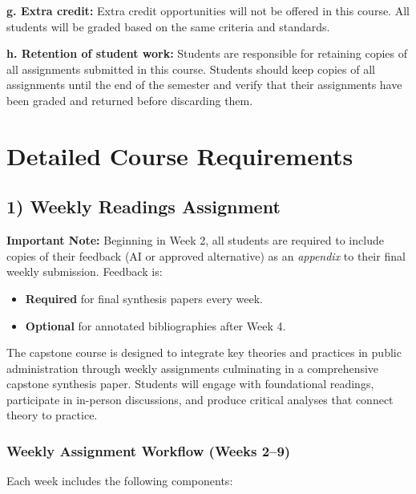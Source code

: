 \documentclass[11pt]{article}     %
\begin{document}
\vspace{1em}
\noindent \textbf{g. Extra credit:}
Extra credit opportunities will not be offered in this course. All students will be graded based on the same criteria and standards.

\vspace{1em}
\noindent \textbf{h. Retention of student work:}
Students are responsible for retaining copies of all assignments submitted in this course. Students should keep copies of all assignments until the end of the semester and verify that their assignments have been graded and returned before discarding them.

\section*{Detailed Course Requirements}

\subsection*{1) Weekly Readings Assignment}

\textbf{Important Note:} Beginning in Week 2, all students are required to include copies of their feedback (AI or approved alternative) as an \emph{appendix} to their final weekly submission. Feedback is:
\begin{itemize}
    \item \textbf{Required} for final synthesis papers every week.
    \item \textbf{Optional} for annotated bibliographies after Week 4.
\end{itemize}

The capstone course is designed to integrate key theories and practices in public administration through weekly assignments culminating in a comprehensive capstone synthesis paper. Students will engage with foundational readings, participate in in-person discussions, and produce critical analyses that connect theory to practice.

\subsubsection*{Weekly Assignment Workflow (Weeks 2--9)}

Each week includes the following components:
\end{document}

